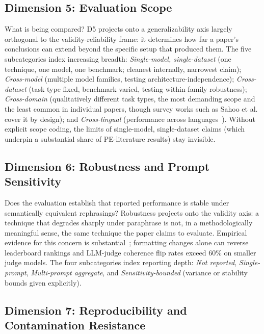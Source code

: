 \documentclass[acmsmall, nonacm, screen]{acmart}
\begin{document}
\subsection{Dimension 5: Evaluation Scope}
\label{subsec:d5}

What is being compared? D5 projects onto a generalizability axis
largely orthogonal to the validity-reliability frame: it determines
how far a paper's conclusions can extend beyond the specific setup
that produced them. The five subcategories index increasing breadth:
\emph{Single-model, single-dataset} (one technique, one model, one
benchmark; cleanest internally, narrowest claim);
\emph{Cross-model} (multiple model families, testing
architecture-independence); \emph{Cross-dataset} (task type fixed,
benchmark varied, testing within-family robustness);
\emph{Cross-domain} (qualitatively different task types, the most
demanding scope and the least common in individual papers, though
survey works such as Sahoo et al.~\cite{sahoo2024systematic} cover it
by design); and \emph{Cross-lingual} (performance across
languages~\cite{vatsal2024survey}). Without explicit scope coding,
the limits of single-model, single-dataset claims (which underpin a
substantial share of PE-literature results) stay invisible.

\subsection{Dimension 6: Robustness and Prompt Sensitivity}
\label{subsec:d6}

Does the evaluation establish that reported performance is stable
under semantically equivalent rephrasings? Robustness projects onto
the validity axis: a technique that degrades sharply under paraphrase
is not, in a methodologically meaningful sense, the same technique the
paper claims to evaluate. Empirical evidence for this concern is
substantial~\cite{sclar2023formatting, butterfly2024,
promptsensitivity2025, bellibatlu2026judgesense}; formatting changes
alone can reverse leaderboard rankings and LLM-judge coherence
flip rates exceed 60\% on smaller judge models. The four subcategories
index reporting depth: \emph{Not reported}, \emph{Single-prompt},
\emph{Multi-prompt aggregate}, and \emph{Sensitivity-bounded}
(variance or stability bounds given explicitly).

\subsection{Dimension 7: Reproducibility and Contamination Resistance}
\label{subsec:d7}
\end{document}
